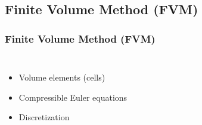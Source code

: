 \subsection{Finite Volume Method (FVM)}


\begin{frame}
\frametitle{Finite Volume Method (FVM)}
\begin{columns}[c]

\begin{itemize}[<+(1)->]
\item Volume elements (cells)
\item Compressible Euler equations
\item Discretization
\setcounter{nonstaggeredpauses}{\thebeamerpauses}
\setcounter{staggeredpauses}{\thebeamerpauses}
\end{itemize}



\end{columns}
\end{frame}
